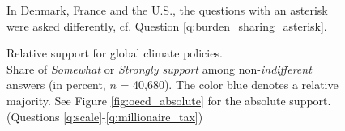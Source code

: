 \begin{figure} %
  \caption[Relative support for global climate policies]{Relative support for global climate policies. \\ Share of \textit{Somewhat} or \textit{Strongly support} among non-\textit{indifferent} answers (in percent, $n$ = 40,680). The color blue denotes a relative majority. See Figure \ref{fig:oecd_absolute} for the absolute support. (Questions \ref{q:scale}-\ref{q:millionaire_tax})} 
  \label{fig:oecd}
  {\footnotesize *In Denmark, France and the U.S., the questions with an asterisk were asked differently, cf. Question \ref{q:burden_sharing_asterisk}. } 
\end{figure}

